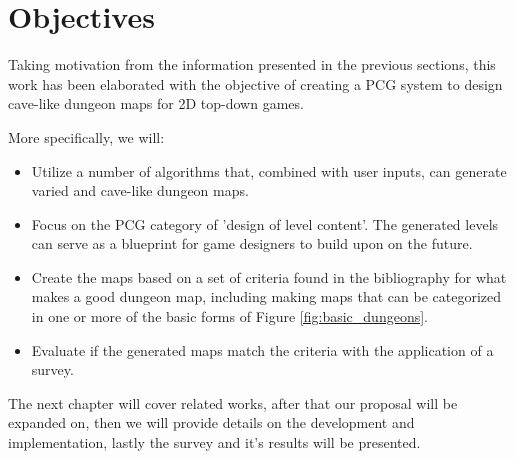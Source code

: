 \section{Objectives}
\label{sec:objectives}

Taking motivation from the information presented in the previous sections, this work has been elaborated with the objective of creating a PCG system to design cave-like dungeon maps for 2D top-down games.

More specifically, we will:

\begin{itemize}
\item \textbf{} Utilize a number of algorithms that, combined with user inputs, can generate varied and cave-like dungeon maps.

\item \textbf{} Focus on the PCG category of 'design of level content'. The generated levels can serve as a blueprint for game designers to build upon on the future.

\item \textbf{} Create the maps based on a set of criteria found in the bibliography for what makes a good dungeon map, including making maps that can be categorized in one or more of the basic forms of Figure \ref{fig:basic_dungeons}.

\item \textbf{} Evaluate if the generated maps match the criteria with the application of a survey.
\end{itemize}

The next chapter will cover related works, after that our proposal will be expanded on, then we will provide details on the development and implementation, lastly the survey and it's results will be presented.